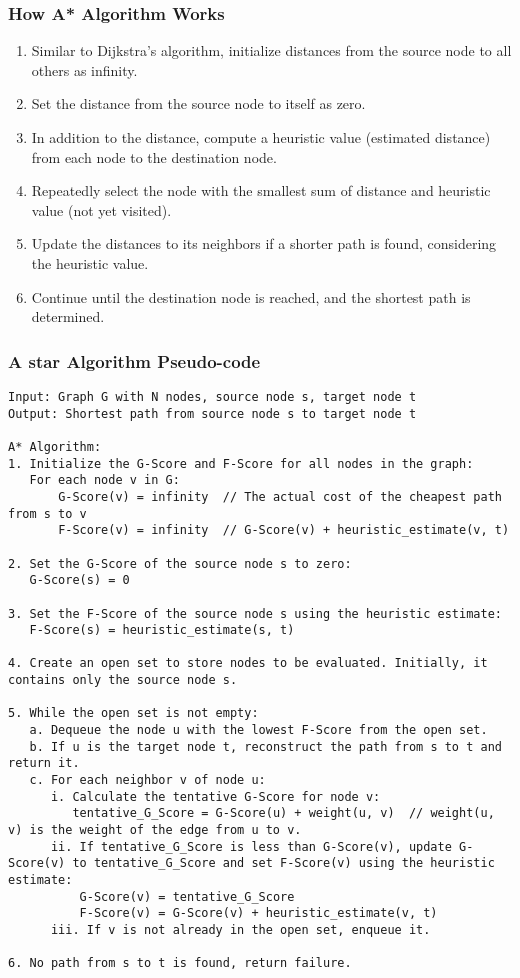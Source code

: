 \begin{frame}[fragile]\frametitle{How A* Algorithm Works}
\begin{enumerate}
\item Similar to Dijkstra's algorithm, initialize distances from the source node to all others as infinity.
\item Set the distance from the source node to itself as zero.
\item In addition to the distance, compute a heuristic value (estimated distance) from each node to the destination node.
\item Repeatedly select the node with the smallest sum of distance and heuristic value (not yet visited).
\item Update the distances to its neighbors if a shorter path is found, considering the heuristic value.
\item Continue until the destination node is reached, and the shortest path is determined.
\end{enumerate}
\end{frame}

\begin{frame}[fragile]\frametitle{A star Algorithm Pseudo-code}

\begin{lstlisting}[basicstyle=\tiny]
Input: Graph G with N nodes, source node s, target node t
Output: Shortest path from source node s to target node t

A* Algorithm:
1. Initialize the G-Score and F-Score for all nodes in the graph:
   For each node v in G:
       G-Score(v) = infinity  // The actual cost of the cheapest path from s to v
       F-Score(v) = infinity  // G-Score(v) + heuristic_estimate(v, t)

2. Set the G-Score of the source node s to zero:
   G-Score(s) = 0

3. Set the F-Score of the source node s using the heuristic estimate:
   F-Score(s) = heuristic_estimate(s, t)

4. Create an open set to store nodes to be evaluated. Initially, it contains only the source node s.

5. While the open set is not empty:
   a. Dequeue the node u with the lowest F-Score from the open set.
   b. If u is the target node t, reconstruct the path from s to t and return it.
   c. For each neighbor v of node u:
      i. Calculate the tentative G-Score for node v:
         tentative_G_Score = G-Score(u) + weight(u, v)  // weight(u, v) is the weight of the edge from u to v.
      ii. If tentative_G_Score is less than G-Score(v), update G-Score(v) to tentative_G_Score and set F-Score(v) using the heuristic estimate:
          G-Score(v) = tentative_G_Score
          F-Score(v) = G-Score(v) + heuristic_estimate(v, t)
      iii. If v is not already in the open set, enqueue it.

6. No path from s to t is found, return failure.
\end{lstlisting}

\end{frame}


